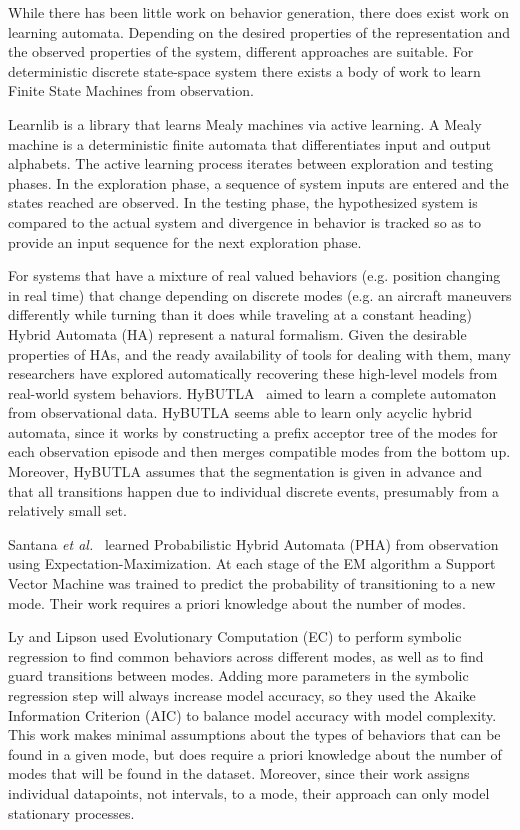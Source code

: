 \documentclass[12pt]{report}
\begin{document}
While there has been little work on behavior generation, there does exist work on learning automata. Depending on the desired properties of the representation and the observed properties of the system, different approaches are suitable.  For deterministic discrete state-space system there exists a body of work to learn Finite State Machines from observation.  

Learnlib \cite{Introduction to Active Automata Learning from
a Practical Perspective?} is a library that learns Mealy machines via active learning.  A Mealy machine is a deterministic finite automata that differentiates input and output alphabets. The active learning process iterates between exploration and testing phases.  In the exploration phase, a sequence of system inputs are entered and the states reached are observed.  In the testing phase, the hypothesized system is compared to the actual system and divergence in behavior is tracked so as to provide an input sequence for the next exploration phase.

For systems that have a mixture of real valued behaviors (e.g. position changing in real time) that change depending on discrete modes (e.g. an aircraft maneuvers differently while turning than it does while traveling at a constant heading) Hybrid Automata (HA) represent a natural formalism. 
Given the desirable properties of HAs, and the ready availability of tools for dealing with them, many researchers have explored automatically recovering these high-level models from real-world system behaviors.
HyBUTLA~\cite{niggemann2012learning} aimed to learn a complete automaton from observational data. HyBUTLA seems able to learn only acyclic hybrid automata, since it works by constructing a prefix acceptor tree of the modes for each observation episode and then merges compatible modes from the bottom up. Moreover, HyBUTLA assumes that the segmentation is given in advance and that all transitions happen due to individual discrete events, presumably from a relatively small set.


Santana \textit{et al.}~\cite{hybridmodels2015santana} learned Probabilistic Hybrid Automata (PHA) from observation using Expectation-Maximization.  At each stage of the EM algorithm a Support Vector Machine was trained to predict the probability of transitioning to a new mode. Their work requires a priori knowledge about the number of modes.


Ly and Lipson used Evolutionary Computation (EC) to perform symbolic regression \cite{Learning Symbolic Representations of Hybrid Dynamical Systems} to find common behaviors across different modes, as well as to find guard transitions between modes.  Adding more parameters in the symbolic regression step will always increase model accuracy, so they used the Akaike Information Criterion (AIC) to balance model accuracy with model complexity.  This work makes minimal assumptions about the types of behaviors that can be found in a given mode, but does require a priori knowledge about the number of modes that will be found in the dataset. Moreover, since their work assigns individual datapoints, not intervals, to a mode, their approach can only model stationary processes.
\end{document}
